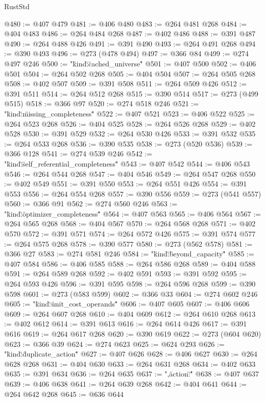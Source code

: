 \begin{lexlean}{RustStd}
\begin{coremodule}
{\begin{coremodule}
{{{{{{{{{{{{{{{{{{{{{{{{{{{{{{{{{{{{{{{{{{{{{{{{{{{{{{{{{{{{{{{{{{{{{@480 := @407 @479
@481 := @406 @480
@483 := @264 @481 @268
@484 := @404 @483
@486 := @264 @484 @268
@487 := @402 @486
@488 := @391 @487
@490 := @264 @488 @426
@491 := @391 @490
@493 := @264 @491 @268
@494 := @390 @493
@496 := @273 (@478 @494)
@497 := @366 @84
@499 := @274 @497 @246
@500 := "{\"kind\":\"cached_universe\""
@501 := @407 @500
@502 := @406 @501
@504 := @264 @502 @268
@505 := @404 @504
@507 := @264 @505 @268
@508 := @402 @507
@509 := @391 @508
@511 := @264 @509 @426
@512 := @391 @511
@514 := @264 @512 @268
@515 := @390 @514
@517 := @273 (@499 @515)
@518 := @366 @97
@520 := @274 @518 @246
@521 := "{\"kind\":\"missing_completeness\""
@522 := @407 @521
@523 := @406 @522
@525 := @264 @523 @268
@526 := @404 @525
@528 := @264 @526 @268
@529 := @402 @528
@530 := @391 @529
@532 := @264 @530 @426
@533 := @391 @532
@535 := @264 @533 @268
@536 := @390 @535
@538 := @273 (@520 @536)
@539 := @366 @128
@541 := @274 @539 @246
@542 := "{\"kind\":\"self_referential_completeness\""
@543 := @407 @542
@544 := @406 @543
@546 := @264 @544 @268
@547 := @404 @546
@549 := @264 @547 @268
@550 := @402 @549
@551 := @391 @550
@553 := @264 @551 @426
@554 := @391 @553
@556 := @264 @554 @268
@557 := @390 @556
@559 := @273 (@541 @557)
@560 := @366 @91
@562 := @274 @560 @246
@563 := "{\"kind\":\"optimizer_completeness\""
@564 := @407 @563
@565 := @406 @564
@567 := @264 @565 @268
@568 := @404 @567
@570 := @264 @568 @268
@571 := @402 @570
@572 := @391 @571
@574 := @264 @572 @426
@575 := @391 @574
@577 := @264 @575 @268
@578 := @390 @577
@580 := @273 (@562 @578)
@581 := @366 @27
@583 := @274 @581 @246
@584 := "{\"kind\":\"beyond_capacity\""
@585 := @407 @584
@586 := @406 @585
@588 := @264 @586 @268
@589 := @404 @588
@591 := @264 @589 @268
@592 := @402 @591
@593 := @391 @592
@595 := @264 @593 @426
@596 := @391 @595
@598 := @264 @596 @268
@599 := @390 @598
@601 := @273 (@583 @599)
@602 := @366 @33
@604 := @274 @602 @246
@605 := "{\"kind\":\"unit_cost_operands\""
@606 := @407 @605
@607 := @406 @606
@609 := @264 @607 @268
@610 := @404 @609
@612 := @264 @610 @268
@613 := @402 @612
@614 := @391 @613
@616 := @264 @614 @426
@617 := @391 @616
@619 := @264 @617 @268
@620 := @390 @619
@622 := @273 (@604 @620)
@623 := @366 @39
@624 := @274 @623
@625 := @624 @293
@626 := "{\"kind\":\"duplicate_action\""
@627 := @407 @626
@628 := @406 @627
@630 := @264 @628 @268
@631 := @404 @630
@633 := @264 @631 @268
@634 := @402 @633
@635 := @391 @634
@636 := @264 @635
@637 := ",\"action\":\""
@638 := @407 @637
@639 := @406 @638
@641 := @264 @639 @268
@642 := @404 @641
@644 := @264 @642 @268
@645 := @636 @644
}}}}}}}}}}}}}}}}}}}}}}}}}}}}}}}}}}}}}}}}}}}}}}}}}}}}}}}}}}}}}}}}}}}}}}}}}}}}
\end{coremodule}}
\end{coremodule}
\end{lexlean}
